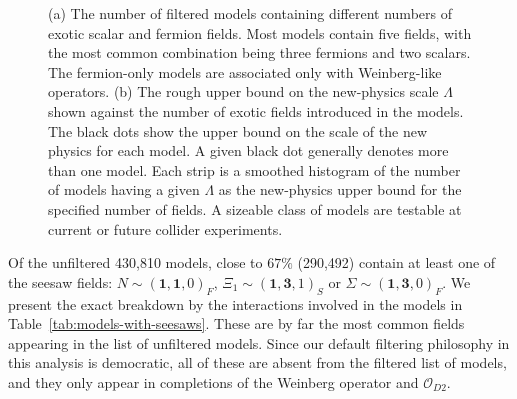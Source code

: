 \begin{figure}
  \centering
  \caption{(a) The number of filtered models containing different numbers of
    exotic scalar and fermion fields. Most models contain five fields, with the
    most common combination being three fermions and two scalars. The
    fermion-only models are associated only with Weinberg-like operators. (b)
    The rough upper bound on the new-physics scale $\Lambda$ shown against the
    number of exotic fields introduced in the models. The black dots show the
    upper bound on the scale of the new physics for each model. A given black
    dot generally denotes more than one model. Each strip is a smoothed
    histogram of the number of models having a given $\Lambda$ as the
    new-physics upper bound for the specified number of fields. A sizeable class
    of models are testable at current or future collider experiments.}
  \label{fig:number-of-fields}
\end{figure}

Of the unfiltered 430,810 models, close to $67\%$ (290,492) contain at least one
of the seesaw fields: $N \sim (\mathbf{1}, \mathbf{1}, 0)_{F}$,
$\Xi_{1} \sim (\mathbf{1}, \mathbf{3}, 1)_{S}$ or
$\Sigma \sim (\mathbf{1}, \mathbf{3}, 0)_{F}$. We present the exact breakdown by
the interactions involved in the models in Table~\ref{tab:models-with-seesaws}.
These are by far the most common fields appearing in the list of unfiltered
models. Since our default filtering philosophy in this analysis is democratic,
all of these are absent from the filtered list of models, and they only appear
in completions of the Weinberg operator and $\mathcal{O}_{D2}$.

